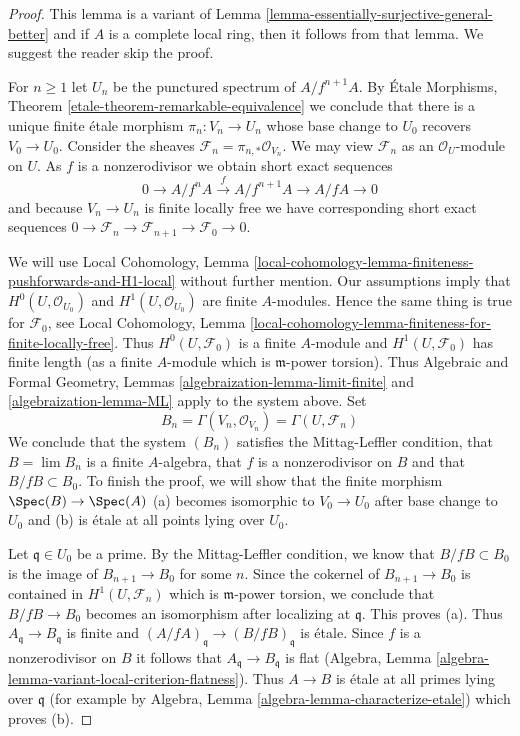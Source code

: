 \begin{proof}
This lemma is a variant of
Lemma \ref{lemma-essentially-surjective-general-better}
and if $A$ is a complete local ring, then it follows from that lemma.
We suggest the reader skip the proof.

\medskip\noindent
For $n \geq 1$ let $U_n$ be the punctured spectrum of $A/f^{n + 1}A$.
By \'Etale Morphisms, Theorem \ref{etale-theorem-remarkable-equivalence}
we conclude that there is a unique finite \'etale morphism
$\pi_n : V_n \to U_n$ whose base change to $U_0$ recovers $V_0 \to U_0$.
Consider the sheaves $\mathcal{F}_n = \pi_{n, *}\mathcal{O}_{V_n}$.
We may view $\mathcal{F}_n$ as an $\mathcal{O}_U$-module on $U$.
As $f$ is a nonzerodivisor we obtain short exact sequences
$$
0 \to A/f^nA \xrightarrow{f} A/f^{n + 1}A \to A/fA \to 0
$$
and because $V_n \to U_n$ is finite locally free we have corresponding
short exact sequences
$0 \to \mathcal{F}_n \to \mathcal{F}_{n + 1} \to \mathcal{F}_0 \to 0$.

\medskip\noindent
We will use Local Cohomology, Lemma
\ref{local-cohomology-lemma-finiteness-pushforwards-and-H1-local}
without further mention.
Our assumptions imply that $H^0(U, \mathcal{O}_{U_0})$ and
$H^1(U, \mathcal{O}_{U_0})$ are finite $A$-modules.
Hence the same thing is true for $\mathcal{F}_0$, see
Local Cohomology, Lemma
\ref{local-cohomology-lemma-finiteness-for-finite-locally-free}.
Thus $H^0(U, \mathcal{F}_0)$ is a finite $A$-module
and $H^1(U, \mathcal{F}_0)$ has finite length
(as a finite $A$-module which is $\mathfrak m$-power torsion).
Thus Algebraic and Formal Geometry, Lemmas
\ref{algebraization-lemma-limit-finite} and
\ref{algebraization-lemma-ML} apply to the system above. Set
$$
B_n = \Gamma(V_n, \mathcal{O}_{V_n}) = \Gamma(U, \mathcal{F}_n)
$$
We conclude that the system $(B_n)$ satisfies the Mittag-Leffler condition,
that $B = \lim B_n$ is a finite $A$-algebra, that $f$ is a nonzerodivisor
on $B$ and that $B/fB \subset B_0$. To finish the proof,
we will show that the finite morphism
$\Spec(B) \to \Spec(A)$ (a) becomes isomorphic to $V_0 \to U_0$
after base change to $U_0$ and (b) is \'etale at all points lying
over $U_0$.

\medskip\noindent
Let $\mathfrak q \in U_0$ be a prime. By the Mittag-Leffler
condition, we know that $B/fB \subset B_0$ is the image of
$B_{n + 1} \to B_0$ for some $n$. Since the cokernel of $B_{n + 1} \to B_0$
is contained in $H^1(U, \mathcal{F}_n)$ which is $\mathfrak m$-power
torsion, we conclude that $B/fB \to B_0$ becomes an isomorphism
after localizing at $\mathfrak q$. This proves (a).
Thus $A_\mathfrak q \to B_\mathfrak q$
is finite and $(A/fA)_\mathfrak q \to (B/fB)_\mathfrak q$ is \'etale.
Since $f$ is a nonzerodivisor on $B$ it follows that
$A_\mathfrak q \to B_\mathfrak q$ is flat
(Algebra, Lemma \ref{algebra-lemma-variant-local-criterion-flatness}).
Thus $A \to B$ is \'etale at all primes lying over $\mathfrak q$
(for example by Algebra, Lemma \ref{algebra-lemma-characterize-etale})
which proves (b).
\end{proof}


